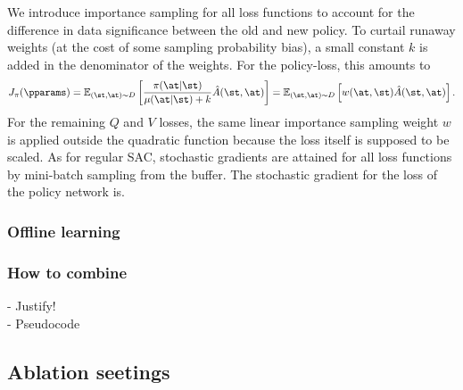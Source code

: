 We introduce importance sampling for all loss functions to account for the difference in data significance between the old and new policy. To curtail runaway weights (at the cost of some sampling probability bias), a small constant \(k\) is added in the denominator of the weights. For the policy-loss, this amounts to
\begin{equation}
    J_\pi(\pparams) = \mathbb{E}_{(\st,\at)\sim D} \left[\frac{\pi(\at|\st)}{\mu(\at|\st) + k}\hat{A}(\st,\at)\right]
    = \mathbb{E}_{(\st,\at)\sim D} \left[w(\at,\st)\hat{A}(\st,\at)\right].
\end{equation}
For the remaining \(Q\) and \(V\) losses, the same linear importance sampling weight \(w\) is applied outside the quadratic function because the loss itself is supposed to be scaled. As for regular SAC, stochastic gradients are attained for all loss functions by mini-batch sampling from the buffer. The stochastic gradient for the loss of the policy network is.


\subsubsection{Offline learning}
\subsubsection{How to combine}
- Justify!\\
- Pseudocode
\subsection{Ablation seetings}



